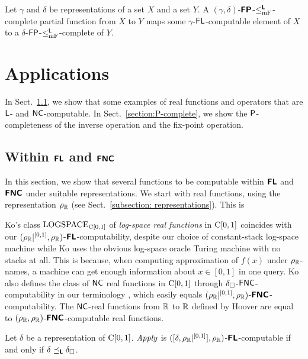 \documentclass[envcountsame,orivec,oribibl]{llncs}
\begin{document}
\begin{lemma}
 \label{lemma:p-comp-maps-l-to-p-comp}
 Let $\gamma$ and $\delta$ be representations of a set $X$ and a set $Y$.
 A $(\gamma, \delta)$-$\text{\bfseries \sffamily \upshape FP}$-$\leq _{\mathrm{mF}} ^{\text{\bfseries \sffamily \upshape L}}$-complete partial function 
 from $X$ to $Y$ maps some $\gamma$-$\mathsf{FL}$-computable element of $X$
 to a $\delta$-$\mathsf{FP}$-$\leq _{\mathrm{mF}}^{\mathsf{L}}$-complete of $Y$.
\end{lemma}

\section{Applications}
\label{section:applications}

In Sect.~\ref{section:function}, 
we show that some examples of real functions and operators 
that are $\mathsf{L}$- and $\mathsf{NC}$-computable.
In Sect.~\ref{section:P-complete}, we show the $\mathsf{P}$-completeness of 
the inverse operation and the fix-point operation.

\subsection{Within $\text{\bfseries \sffamily \upshape FL}$ and $\text{\bfseries \sffamily \upshape FNC}$}
\label{section:function}

In this section, we show that several functions to be 
computable within $\text{\bfseries \sffamily \upshape FL}$ and $\text{\bfseries \sffamily \upshape FNC}$
under suitable representations. 
We start with real functions, 
using the representation $\rho _\mathbb R$
(see Sect.~\ref{subsection: representations}). 
This is 

Ko's class $\mathrm{LOGSPACE}_{\mathrm C[0,1]}$ of
\emph{log-space real functions} in $\mathrm C[0,1]$ 
\cite{ko1991complexity} 
coincides with our $(\rho _\mathbb R|^{[0,1]}, \rho _\mathbb R)$-$\text{\bfseries \sffamily \upshape FL}$-computability, 
despite our choice of constant-stack log-space machine 
while Ko uses the obvious log-space oracle Turing machine 
with no stacks at all.
This is because, 
when computing approximation of $f(x)$ under $\rho _\mathbb R$-names, 
a machine can get enough information about $x \in [0,1]$ in one query.
Ko also defines the class of $\mathsf{NC}$ real functions in $\mathrm C[0,1]$
through $\delta _\square$-$\mathsf{FNC}$-computability in our terminology 
\cite{ko1991complexity},
which easily equals $(\rho _\mathbb R|^{[0,1]}, \rho _\mathbb R)$-$\text{\bfseries \sffamily \upshape FNC}$-computability.
The $\mathsf{NC}$-real functions from $\mathbb R$ to $\mathbb R$ defined by Hoover \cite{hoover1991real}
are equal to $(\rho _\mathbb R, \rho _\mathbb R)$-$\text{\bfseries \sffamily \upshape FNC}$-computable real functions.

\begin{theorem}
 \label{theorem:apply-is-L-computable}
 Let $\delta$ be a representation of $\mathrm C[0, 1]$.
 $\mathit{Apply}$ is $([\delta, \rho _\mathbb R|^{[0,1]}], \rho _\mathbb R)$-$\text{\bfseries \sffamily \upshape FL}$-computable if
 and only if $\delta \preceq_{\text{\bfseries \sffamily \upshape L}} \delta _\square$.
\end{theorem}
\end{document}

